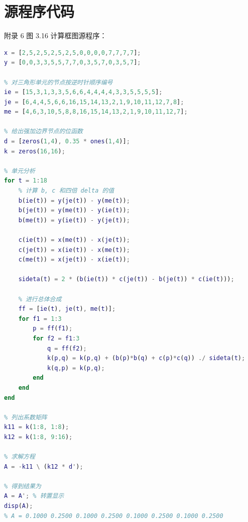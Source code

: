 \documentclass[a4paper, 12pt]{article}
\begin{document}
\section{源程序代码}

附录 6 图 3.16 计算框图源程序：

\begin{lstlisting}[language=Matlab, caption={有限元计算 MATLAB 源程序}]
% 首先给出节点坐标 (x,y)
x = [2,5,2,5,2,5,2,5,0,0,0,0,7,7,7,7];
y = [0,0,3,3,5,5,7,7,0,3,5,7,0,3,5,7];

% 对三角形单元的节点按逆时针顺序编号
ie = [15,3,1,3,3,5,6,6,4,4,4,4,3,3,5,5,5,5];
je = [6,4,4,5,6,6,16,15,14,13,2,1,9,10,11,12,7,8];
me = [4,6,3,10,5,8,8,16,15,14,13,2,1,9,10,11,12,7];

% 给出强加边界节点的位函数
d = [zeros(1,4), 0.35 * ones(1,4)];
k = zeros(16,16);

% 单元分析
for t = 1:18
    % 计算 b, c 和四倍 delta 的值
    b(ie(t)) = y(je(t)) - y(me(t));
    b(je(t)) = y(me(t)) - y(ie(t));
    b(me(t)) = y(ie(t)) - y(je(t));
    
    c(ie(t)) = x(me(t)) - x(je(t));
    c(je(t)) = x(ie(t)) - x(me(t));
    c(me(t)) = x(je(t)) - x(ie(t));
    
    sideta(t) = 2 * (b(ie(t)) * c(je(t)) - b(je(t)) * c(ie(t)));
    
    % 进行总体合成
    ff = [ie(t), je(t), me(t)];
    for f1 = 1:3
        p = ff(f1);
        for f2 = f1:3
            q = ff(f2);
            k(p,q) = k(p,q) + (b(p)*b(q) + c(p)*c(q)) ./ sideta(t);
            k(q,p) = k(p,q);
        end
    end
end

% 列出系数矩阵
k11 = k(1:8, 1:8);
k12 = k(1:8, 9:16);

% 求解方程
A = -k11 \ (k12 * d');

% 得到结果为
A = A'; % 转置显示
disp(A);
% A = 0.1000 0.2500 0.1000 0.2500 0.1000 0.2500 0.1000 0.2500
\end{lstlisting}
\end{document}

